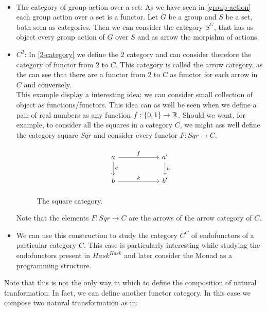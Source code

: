 \begin{example}\ 
  \begin{itemize}
  \item The category of group action over a set: As we have seen in \ref{group-action} each group action over a set is a functor. Let $G$ be a group and $S$ be a set, both seen as categories. Then we can consider the category  $S^G$, that has as object every group action of $G$ over $S$ and as arrow the morpishm of actions.\\
    
  \item $C^2$: In \ref{2-category} we define the $2$ category and  can consider therefore the category of functor from $2$ to $C$. This category is called the arrow category, as the can see that there are a functor from $2$ to $C$ as functor for each arrow in $C$ and conversely.\\

    This example display a interesting idea: we can consider small collection of object as functions/functors. This idea can as well be seen when we define a pair of real numbers as any function $f:\{0,1\} \to \mathbb{R}$. Should we want, for example, to consider all the squares in a category $C$, we might ass well define the category square $Sqr$ and consider every functor $F:Sqr \to C$.
    \begin{figure}[!h]
      \[
        \begin{tikzpicture}
          \node {\begin{tikzcd}[column sep=20mm]
              a\ar[r,"f"]\ar[d,"g"] & a'\ar[d,"h"]\\
              b\ar[r,"k"] & b'
            \end{tikzcd}};
        \end{tikzpicture}
      \]
      \caption*{The square category.}
    \end{figure}

    Note that the elements $F:Sqr \to C$ are the arrows of the arrow category of $C$.
      
  \item We can use this construction to study the category $C^C$ of endofunctors of a particular category $C$. This case is particularly interesting while studying the endofunctors present in $Hask^{Hask}$ and later consider the Monad as a programming structure. 
  \end{itemize}
\end{example}

Note that this is not the only way in which to define the composition of natural tranformation. In fact, we can define another functor category. In this case we compose two natural transformation as in:

